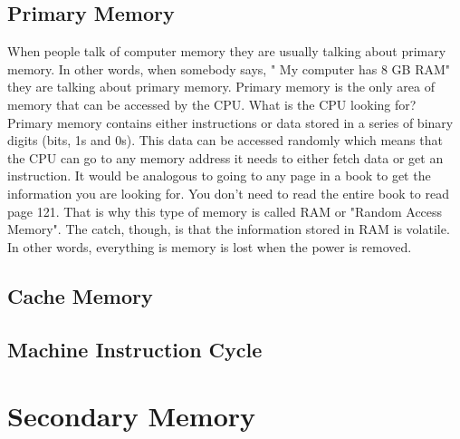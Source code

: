 \subsection*{Primary Memory}
When people talk of computer memory they are usually talking about primary memory. In other words, when somebody says, " My computer has 8 GB RAM" they are talking about primary memory. Primary memory is the only area of memory that can be accessed by the CPU. What is the CPU looking for? Primary memory contains either instructions or data stored in a series of binary digits (bits, 1s and 0s). This data can be accessed randomly which means that the CPU can go to any memory address it needs to either fetch data or get an instruction. It would be analogous to going to any page in a book to get the information you are looking for. You don't need to read the entire book to read page 121. That is why this type of memory is called RAM or "Random Access Memory". The catch, though, is that the information stored in RAM is volatile. In other words, everything is memory is lost when the power is removed.


\subsection*{Cache Memory}

\subsection*{Machine Instruction Cycle}
\section{Secondary Memory}
